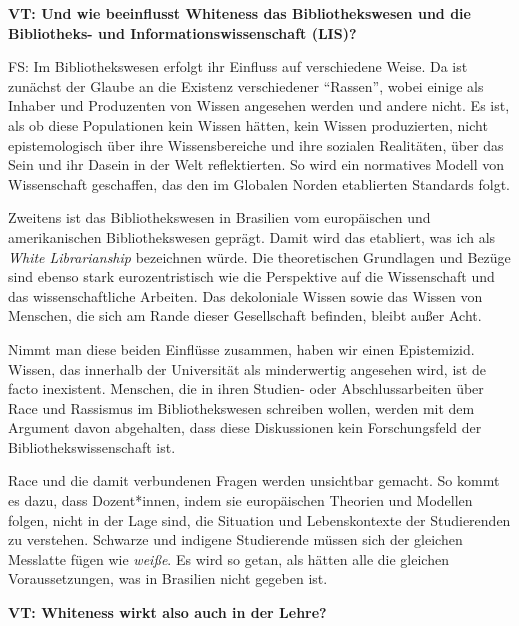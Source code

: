 \documentclass[a4paper,
fontsize=11pt,
oneside,
numbers=noperiodatend,
parskip=half-,
bibliography=totoc,
final
]{scrartcl}
\begin{document}
\textbf{VT: Und wie beeinflusst Whiteness das Bibliothekswesen und die
Bibliotheks- und Informationswissenschaft (LIS)?}

FS: Im Bibliothekswesen erfolgt ihr Einfluss auf verschiedene Weise. Da
ist zunächst der Glaube an die Existenz verschiedener \enquote{Rassen},
wobei einige als Inhaber und Produzenten von Wissen angesehen werden und
andere nicht. Es ist, als ob diese Populationen kein Wissen hätten, kein
Wissen produzierten, nicht epistemologisch über ihre Wissensbereiche und
ihre sozialen Realitäten, über das Sein und ihr Dasein in der Welt
reflektierten. So wird ein normatives Modell von Wissenschaft
geschaffen, das den im Globalen Norden etablierten Standards folgt.

Zweitens ist das Bibliothekswesen in Brasilien vom europäischen und
amerikanischen Bibliothekswesen geprägt. Damit wird das etabliert, was
ich als \emph{White Librarianship} bezeichnen würde. Die theoretischen
Grundlagen und Bezüge sind ebenso stark eurozentristisch wie die
Perspektive auf die Wissenschaft und das wissenschaftliche Arbeiten. Das
dekoloniale Wissen sowie das Wissen von Menschen, die sich am Rande
dieser Gesellschaft befinden, bleibt außer Acht.

Nimmt man diese beiden Einflüsse zusammen, haben wir einen Epistemizid.
Wissen, das innerhalb der Universität als minderwertig angesehen wird,
ist de facto inexistent. Menschen, die in ihren Studien- oder
Abschlussarbeiten über Race und Rassismus im Bibliothekswesen schreiben
wollen, werden mit dem Argument davon abgehalten, dass diese
Diskussionen kein Forschungsfeld der Bibliothekswissenschaft ist.

Race und die damit verbundenen Fragen werden unsichtbar gemacht. So
kommt es dazu, dass Dozent*innen, indem sie europäischen Theorien und
Modellen folgen, nicht in der Lage sind, die Situation und
Lebenskontexte der Studierenden zu verstehen. Schwarze und indigene
Studierende müssen sich der gleichen Messlatte fügen wie \emph{weiße}.
Es wird so getan, als hätten alle die gleichen Voraussetzungen, was in
Brasilien nicht gegeben ist.

\textbf{VT: Whiteness wirkt also auch in der Lehre?}
\end{document}
